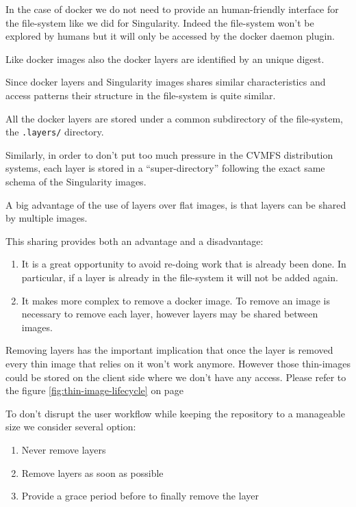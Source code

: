 In the case of docker we do not need to provide an human-friendly interface for the file-system like we did for Singularity. Indeed the file-system won't be explored by humans but it will only be accessed by the docker daemon plugin.

Like docker images also the docker layers are identified by an unique digest.

Since docker layers and Singularity images shares similar characteristics and access patterns their structure in the file-system is quite similar.

All the docker layers are stored under a common subdirectory of the file-system, the \texttt{.layers/} directory.

Similarly, in order to don’t put too much pressure in the CVMFS distribution systems, each layer is stored in a “super-directory” following the exact same schema of the Singularity images.

A big advantage of the use of layers over flat images, is that layers can be shared by multiple images.

This sharing provides both an advantage and a disadvantage:
\begin{enumerate}
        \item It is a great opportunity to avoid re-doing work that is already been done. In particular, if a layer is already in the file-system it will not be added again.
        \item It makes more complex to remove a docker image. To remove an image is necessary to remove each layer, however layers may be shared between images.
\end{enumerate}

Removing layers has the important implication that once the layer is removed every thin image that relies on it won’t work anymore.
However those thin-images could be stored on the client side where we don’t have any access.
Please refer to the figure \ref{fig:thin-image-lifecycle} on page \pageref{fig:thin-image-lifecycle}

To don't disrupt the user workflow while keeping the repository to a manageable size we consider several option:
\begin{enumerate}
\item Never remove layers
\item Remove layers as soon as possible
\item Provide a grace period before to finally remove the layer
\end{enumerate}

